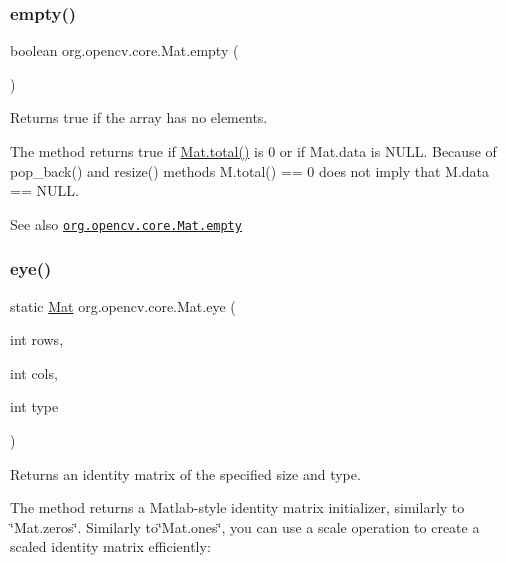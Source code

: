 \subsubsection{\texorpdfstring{empty()}{empty()}}
{\footnotesize\ttfamily boolean org.\+opencv.\+core.\+Mat.\+empty (\begin{DoxyParamCaption}{ }\end{DoxyParamCaption})}

Returns {\ttfamily true} if the array has no elements.

The method returns {\ttfamily true} if {\ttfamily \mbox{\hyperlink{classorg_1_1opencv_1_1core_1_1_mat_a0aa57e546fe72e994dafe806f47f0081}{Mat.\+total()}}} is 0 or if {\ttfamily Mat.\+data} is N\+U\+LL. Because of {\ttfamily pop\+\_\+back()} and {\ttfamily resize()} methods {\ttfamily M.\+total() == 0} does not imply that {\ttfamily M.\+data == N\+U\+LL}.

\begin{DoxySeeAlso}{See also}
\href{http://docs.opencv.org/modules/core/doc/basic_structures.html#mat-empty}{\tt org.\+opencv.\+core.\+Mat.\+empty} 
\end{DoxySeeAlso}
\mbox{\label{classorg_1_1opencv_1_1core_1_1_mat_a4de6ffd10feb724153f1ec1231533aa9}} 
\subsubsection{\texorpdfstring{eye()}{eye()}\hspace{0.1cm}{\footnotesize\ttfamily [1/2]}}
{\footnotesize\ttfamily static \mbox{\hyperlink{classorg_1_1opencv_1_1core_1_1_mat}{Mat}} org.\+opencv.\+core.\+Mat.\+eye (\begin{DoxyParamCaption}\item[{int}]{rows,  }\item[{int}]{cols,  }\item[{int}]{type }\end{DoxyParamCaption})\hspace{0.3cm}{\ttfamily [static]}}

Returns an identity matrix of the specified size and type.

The method returns a Matlab-\/style identity matrix initializer, similarly to \char`\"{}\+Mat.\+zeros\char`\"{}. Similarly to\char`\"{}\+Mat.\+ones\char`\"{}, you can use a scale operation to create a scaled identity matrix efficiently\+: {\ttfamily }

